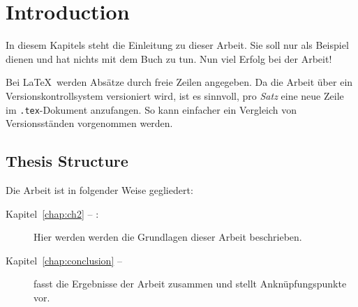 
\chapter{Introduction}
In diesem Kapitels steht die Einleitung zu dieser Arbeit.
Sie soll nur als Beispiel dienen und hat nichts mit dem Buch \cite{WSPA} \cite{SAVOIR} zu tun.
Nun viel Erfolg bei der Arbeit!

Bei \LaTeX\ werden Absätze durch freie Zeilen angegeben.
Da die Arbeit über ein Versionskontrollsystem versioniert wird, ist es sinnvoll, pro \emph{Satz} eine neue Zeile im \texttt{.tex}-Dokument anzufangen.
So kann einfacher ein Vergleich von Versionsständen vorgenommen werden.

\section*{Thesis Structure}
Die Arbeit ist in folgender Weise gegliedert:
\begin{description}
\item[Kapitel~\ref{chap:ch2} -- :] Hier werden werden die Grundlagen dieser Arbeit beschrieben.
\item[Kapitel~\ref{chap:conclusion} -- ] fasst die Ergebnisse der Arbeit zusammen und stellt Anknüpfungspunkte vor.
\end{description}
